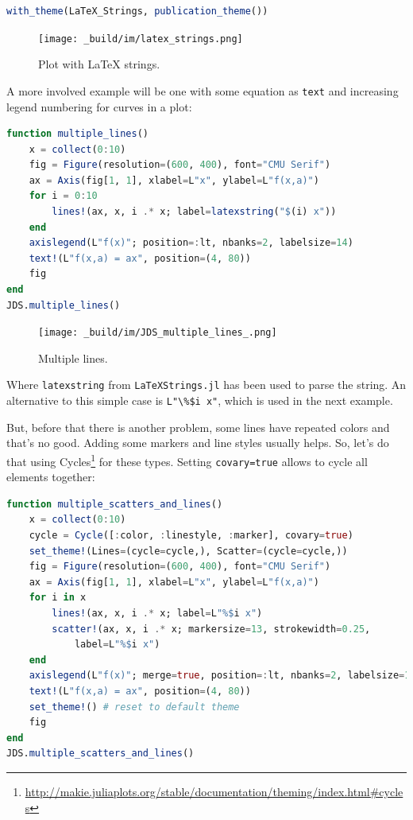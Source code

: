 \documentclass[
  notoc %
]{tufte-book}
\DeclareRobustCommand{\href}[2]{#2\footnote{\url{#1}}}
\newcommand{\passthrough}[1]{#1}
\begin{document}
\begin{lstlisting}[language=Julia]
with_theme(LaTeX_Strings, publication_theme())
\end{lstlisting}

\begin{figure}
\hypertarget{fig:latex_strings}{%
\centering
\texttt{[image: \_build/im/latex\_strings.png]}
\caption{Plot with LaTeX strings.}\label{fig:latex_strings}
}
\end{figure}

A more involved example will be one with some equation as
\passthrough{\lstinline!text!} and increasing legend numbering for
curves in a plot:

\begin{lstlisting}[language=Julia]
function multiple_lines()
    x = collect(0:10)
    fig = Figure(resolution=(600, 400), font="CMU Serif")
    ax = Axis(fig[1, 1], xlabel=L"x", ylabel=L"f(x,a)")
    for i = 0:10
        lines!(ax, x, i .* x; label=latexstring("$(i) x"))
    end
    axislegend(L"f(x)"; position=:lt, nbanks=2, labelsize=14)
    text!(L"f(x,a) = ax", position=(4, 80))
    fig
end
JDS.multiple_lines()
\end{lstlisting}

\begin{figure}
\hypertarget{fig:multiple_lines}{%
\centering
\texttt{[image: \_build/im/JDS\_multiple\_lines\_.png]}
\caption{Multiple lines.}\label{fig:multiple_lines}
}
\end{figure}

Where \passthrough{\lstinline!latexstring!} from
\passthrough{\lstinline!LaTeXStrings.jl!} has been used to parse the
string. An alternative to this simple case is
\passthrough{\lstinline!L"\%$i x"!}, which is used in the next example.

But, before that there is another problem, some lines have repeated
colors and that's no good. Adding some markers and line styles usually
helps. So, let's do that using
\href{http://makie.juliaplots.org/stable/documentation/theming/index.html\#cycles}{Cycles}
for these types. Setting \passthrough{\lstinline!covary=true!} allows to
cycle all elements together:

\begin{lstlisting}[language=Julia]
function multiple_scatters_and_lines()
    x = collect(0:10)
    cycle = Cycle([:color, :linestyle, :marker], covary=true)
    set_theme!(Lines=(cycle=cycle,), Scatter=(cycle=cycle,))
    fig = Figure(resolution=(600, 400), font="CMU Serif")
    ax = Axis(fig[1, 1], xlabel=L"x", ylabel=L"f(x,a)")
    for i in x
        lines!(ax, x, i .* x; label=L"%$i x")
        scatter!(ax, x, i .* x; markersize=13, strokewidth=0.25,
            label=L"%$i x")
    end
    axislegend(L"f(x)"; merge=true, position=:lt, nbanks=2, labelsize=14)
    text!(L"f(x,a) = ax", position=(4, 80))
    set_theme!() # reset to default theme
    fig
end
JDS.multiple_scatters_and_lines()
\end{lstlisting}
\end{document}
